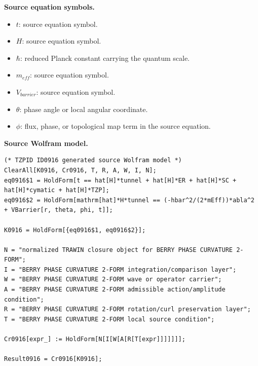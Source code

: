 \begin{minipage}[t]{0.49\linewidth}
\begingroup
\small
\raggedright
\textbf{Source equation symbols.}\par
\begin{itemize}[leftmargin=1.35em,itemsep=1pt,topsep=1pt,parsep=0pt]
    \item $t$: source equation symbol.
    \item $H$: source equation symbol.
    \item $\hbar$: reduced Planck constant carrying the quantum scale.
    \item $m_{eff}$: source equation symbol.
    \item $V_{barrier}$: source equation symbol.
    \item $\theta$: phase angle or local angular coordinate.
    \item $\phi$: flux, phase, or topological map term in the source equation.
\end{itemize}
\endgroup
\end{minipage}\hfill
\begin{minipage}[t]{0.47\linewidth}
\begingroup
\scriptsize
\raggedright
\textbf{Source Wolfram model.}\par
\begin{Verbatim}[fontsize=\tiny,breaklines=true,breakanywhere=true]
(* TZPID ID0916 generated source Wolfram model *)
ClearAll[K0916, Cr0916, T, R, A, W, I, N];
eq0916$1 = HoldForm[t == hat[H]*tunnel + hat[H]*ER + hat[H]*SC + hat[H]*cymatic + hat[H]*TZP];
eq0916$2 = HoldForm[mathrm[hat]*H*tunnel == (-hbar^2/(2*mEff))*abla^2 + VBarrier[r, theta, phi, t]];

K0916 = HoldForm[{eq0916$1, eq0916$2}];

N = "normalized TRAWIN closure object for BERRY PHASE CURVATURE 2-FORM";
I = "BERRY PHASE CURVATURE 2-FORM integration/comparison layer";
W = "BERRY PHASE CURVATURE 2-FORM wave or operator carrier";
A = "BERRY PHASE CURVATURE 2-FORM admissible action/amplitude condition";
R = "BERRY PHASE CURVATURE 2-FORM rotation/curl preservation layer";
T = "BERRY PHASE CURVATURE 2-FORM local source condition";

Cr0916[expr_] := HoldForm[N[I[W[A[R[T[expr]]]]]]];

Result0916 = Cr0916[K0916];
\end{Verbatim}
\endgroup
\end{minipage}

